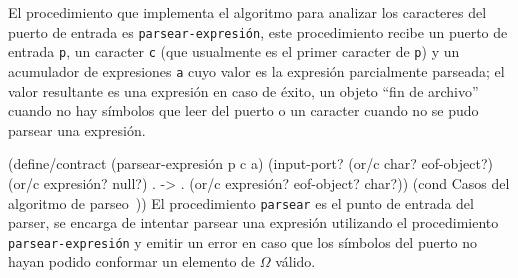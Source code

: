 \documentclass[10pt,oneside,openany,letterpaper]{book}
\begin{document}
El procedimiento que implementa el algoritmo para analizar los caracteres del puerto de entrada es {\tt{}\protect{}\protect{}parsear\protect{}-expresión}, este procedimiento recibe un puerto de entrada {\tt{}p}, un caracter {\tt{}c} (que usualmente es el primer caracter de {\tt{}p}) y un acumulador de expresiones {\tt{}a} cuyo valor es la expresión parcialmente parseada; el valor resultante es una expresión en caso de éxito, un objeto ``fin de archivo'' cuando no hay símbolos que leer del puerto o un caracter cuando no se pudo parsear una expresión.

\nwenddocs{}\endmoddef
(define/contract (parsear-expresión p c a)
  (input-port? (or/c char? eof-object?) (or/c expresión? null?)
               . -> . (or/c expresión? eof-object? char?))
  (cond \LA{}Casos del algoritmo de parseo~{\nwtagstyle{}}\RA{}))
\eatline
{}\nwendcode{}\nwdocspar
El procedimiento {\tt{}\protect{}parsear} es el punto de entrada del parser, se encarga de intentar parsear una expresión utilizando el procedimiento {\tt{}\protect{}parsear\protect{}-expresión} y emitir un error en caso que los símbolos del puerto no hayan podido conformar un elemento de \( Ω \) válido.
\end{document}
